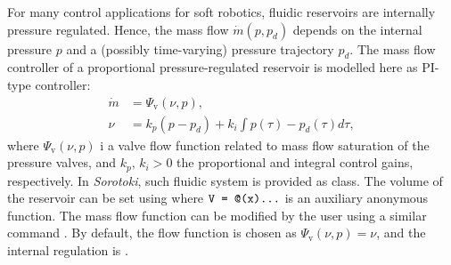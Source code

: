 For many control applications for soft robotics, fluidic reservoirs are internally pressure regulated. Hence, the mass flow $\dot{m}(p,p_d)$ depends on the internal pressure $p$ and a (possibly time-varying) pressure trajectory $p_d$. The mass flow controller of a proportional pressure-regulated reservoir is modelled here as PI-type controller:
%
\begin{align}
    \dot{m} & = \Psi_\textrm{v}(\nu,p),                            \\
    \nu     & = k_p(p - p_d) + k_i \int p(\tau) - p_d(\tau) d\tau,
\end{align}
%
where $\Psi_{\textrm{v}}(\nu,p)$ i a valve flow function related to mass flow saturation of the pressure valves, and $k_p,\,k_i >0$ the proportional and integral control gains, respectively. In \textit{Sorotoki}, such fluidic system is provided as  class. The volume of the reservoir can be set using  where $\texttt{V = @(x)...}$ is an auxiliary anonymous function. The mass flow function can be modified by the user using a similar command . By default, the flow function is chosen as $\Psi_{\textrm{v}}(\nu,p) = \nu$, and the internal regulation is . \\


